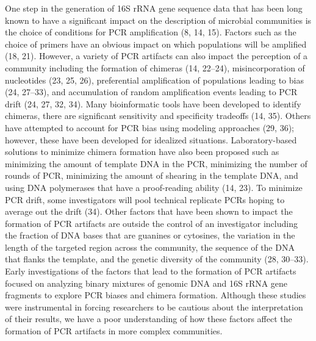 \documentclass[11,]{article}
\begin{document}
One step in the generation of 16S rRNA gene sequence data that has been
long known to have a significant impact on the description of microbial
communities is the choice of conditions for PCR amplification (8, 14,
15). Factors such as the choice of primers have an obvious impact on
which populations will be amplified (18, 21). However, a variety of PCR
artifacts can also impact the perception of a community including the
formation of chimeras (14, 22--24), misincorporation of nucleotides (23,
25, 26), preferential amplification of populations leading to bias (24,
27--33), and accumulation of random amplification events leading to PCR
drift (24, 27, 32, 34). Many bioinformatic tools have been developed to
identify chimeras, there are significant sensitivity and specificity
tradeoffs (14, 35). Others have attempted to account for PCR bias using
modeling approaches (29, 36); however, these have been developed for
idealized situations. Laboratory-based solutions to minimize chimera
formation have also been proposed such as minimizing the amount of
template DNA in the PCR, minimizing the number of rounds of PCR,
minimizing the amount of shearing in the template DNA, and using DNA
polymerases that have a proof-reading ability (14, 23). To minimize PCR
drift, some investigators will pool technical replicate PCRs hoping to
average out the drift (34). Other factors that have been shown to impact
the formation of PCR artifacts are outside the control of an
investigator including the fraction of DNA bases that are guanines or
cytosines, the variation in the length of the targeted region across the
community, the sequence of the DNA that flanks the template, and the
genetic diversity of the community (28, 30--33). Early investigations of
the factors that lead to the formation of PCR artifacts focused on
analyzing binary mixtures of genomic DNA and 16S rRNA gene fragments to
explore PCR biases and chimera formation. Although these studies were
instrumental in forcing researchers to be cautious about the
interpretation of their results, we have a poor understanding of how
these factors affect the formation of PCR artifacts in more complex
communities.
\end{document}
